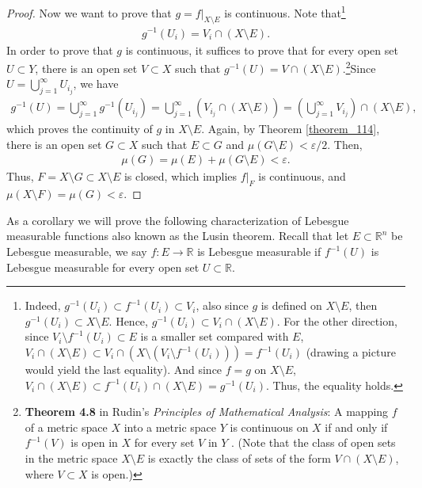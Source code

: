 \documentclass[11pt]{book}
\theoremstyle{definition}
\numberwithin{equation}{chapter}
\begin{document}
\begin{proof}
Now we want to prove that $g = f|_{X \setminus E}$ is continuous. Note that\footnote{Indeed, $g^{-1}(U_i) \subset f^{-1}(U_i) \subset V_i$, also since $g$ is defined on $X \setminus E$, then $g^{-1}(U_i) \subset X \setminus E$. Hence, $g^{-1}(U_i) \subset V_i \cap (X \setminus E)$. For the other direction, since $V_i\setminus f^{-1}(U_i) \subset E$ is a smaller set compared with $E$, $V_i \cap (X \setminus E) \subset V_i \cap \left(X \setminus (V_i\setminus f^{-1}(U_i))\right) = f^{-1}(U_i)$ (drawing a picture would yield the last equality). And since $f = g$ on $X \setminus E$, $V_i \cap (X \setminus E) \subset f^{-1}(U_i) \cap (X \setminus E) = g^{-1}(U_i)$. Thus, the equality holds.}
\begin{align*}
    g^{-1}(U_i) = V_i \cap (X \setminus E).
\end{align*}
In order to prove that $g$ is continuous, it suffices to prove that for every open set $U \subset Y$, there is an open set $V \subset X$ such that $g^{-1}(U) = V \cap (X \setminus E)$.\footnote{{\bf Theorem 4.8} in Rudin's {\em Principles of Mathematical Analysis}: A mapping $f$ of a metric space $X$ into a metric space $Y$ is continuous on $X$ if and only if $f^{-1}(V)$ is open in $X$ for every set $V$ in $Y$ \cite{28}. (Note that the class of open sets in the metric space $X \setminus E$ is exactly the class of sets of the form $V \cap (X \setminus E)$, where $V \subset X$ is open.)}Since $U = \bigcup^\infty_{j=1} U_{i_j}$, we have
\begin{align*}
    g^{-1}(U) = \bigcup^\infty_{j=1} g^{-1}(U_{i_j}) = \bigcup^\infty_{j=1}\left(V_{i_j} \cap (X \setminus E)\right) = \left(\bigcup^\infty_{j=1} V_{i_j} \right) \cap (X \setminus E),
\end{align*}
which proves the continuity of $g$ in $X \setminus E$. Again, by Theorem \ref{theorem_114}, there is an open set $G \subset X$ such that $E \subset G$ and $\mu(G \setminus E) < \varepsilon/2$. Then, 
\begin{align*}
    \mu(G) = \mu(E) + \mu(G \setminus E) < \varepsilon.
\end{align*}
Thus, $F = X \setminus G \subset X \setminus E$ is closed, which implies $f|_F$ is continuous, and $\mu(X \setminus F) = \mu(G) < \varepsilon$.
\end{proof} 

\medskip
As a corollary we will prove the following characterization of Lebesgue measurable functions also known as the Lusin theorem. Recall that let $E \subset \mathbb{R}^n$ be Lebesgue measurable, we say $f: E \to \mathbb{R}$ is Lebesgue measurable if $f^{-1}(U)$ is Lebesgue measurable for every open set $U \subset \mathbb{R}$.
\end{document}
